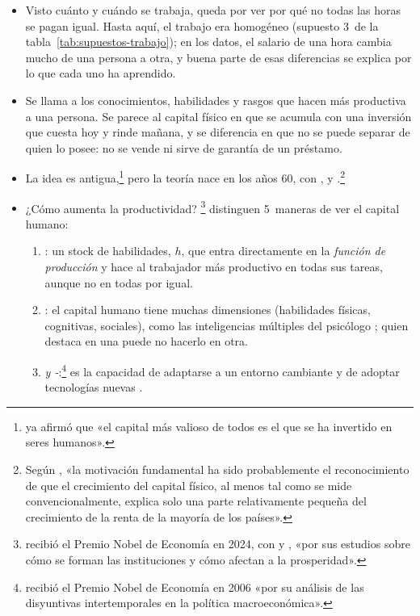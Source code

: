 \documentclass[11pt]{article}
\begin{document}
\begin{itemize}
\item Visto cuánto y cuándo se trabaja, queda por ver por qué no todas las horas se pagan igual. Hasta aquí, el trabajo era homogéneo (supuesto 3~de la tabla~\ref{tab:supuestos-trabajo}); en los datos, el salario de una hora cambia mucho de una persona a otra, y buena parte de esas diferencias se explica por lo que cada uno ha aprendido.
\item Se llama  a los conocimientos, habilidades y rasgos que hacen más productiva a una persona. Se parece al capital físico en que se acumula con una inversión que cuesta hoy y rinde mañana, y se diferencia en que no se puede separar de quien lo posee: no se vende ni sirve de garantía de un préstamo.
\item La idea es antigua,\footnote{\textcite{Marshall1890Principles} ya afirmó que «el capital más valioso de todos es el que se ha invertido en seres humanos».} pero la teoría nace en los años 60, con \textcite{Mincer1958Investment}, \textcite{Schultz1961Investment} y \textcite{Becker1962Investment,Becker1964Human}.\footnote{Según , «la motivación fundamental ha sido probablemente el reconocimiento de que el crecimiento del capital físico, al menos tal como se mide convencionalmente, explica solo una parte relativamente pequeña del crecimiento de la renta de la mayoría de los países»\nocite{Becker1964Human}.}
\item ¿Cómo aumenta la productividad? \textcite[cap.~1]{AcemogluAutor2011Lectures}\footnote{ recibió el Premio Nobel de Economía en 2024, con  y , «por sus estudios sobre cómo se forman las instituciones y cómo afectan a la prosperidad»\nocite{NobelPrize2024}.} distinguen 5~maneras de ver el capital humano:
  \begin{enumerate}
  \item \emph{}: un stock de habilidades, $h$, que entra directamente en la \emph{función de producción} y hace al trabajador más productivo en todas sus tareas, aunque no en todas por igual.
  \item \emph{}: el capital humano tiene muchas dimensiones (habilidades físicas, cognitivas, sociales), como las inteligencias múltiples del psicólogo \nocite{Gardner1983Frames}; quien destaca en una puede no hacerlo en otra.
  \item \emph{ y -}:\footnote{ recibió el Premio Nobel de Economía en 2006 «por su análisis de las disyuntivas intertemporales en la política macroeconómica»\nocite{Nobel2006Phelps}.} es la capacidad de adaptarse a un entorno cambiante y de adoptar tecnologías nuevas\nocite{NelsonPhelps1966Investment,Schultz1975Value} .

\end{enumerate}
\end{itemize}
\end{document}
